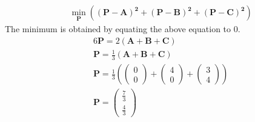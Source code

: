 \documentclass[journal,10pt,twocolumn]{article}
\let\vec\mathbf
\newcommand{\myvec}[1]{\ensuremath{\begin{pmatrix}#1\end{pmatrix}}}
\begin{document}
\begin{align*}
	&\min_{\vec{P}}(\vec{(P-A)^2}+\vec{(P-B)^2}+\vec{(P-C)^2})
\end{align*}
The minimum is obtained by equating the above equation to 0.\\
\begin{align*}
	&6\vec{P} = 2\vec{(A+B+C)}\\
	&\vec{P} =\frac{1}{3}\vec{(A+B+C)}\\
	&\vec{P} = \frac{1}{3}(\myvec{0\\0}+\myvec{4\\0}+\myvec{3\\4})\\
	&\vec{P} =\myvec{\frac{7}{3}\\\frac{4}{3}}
\end{align*}
\end{document}
